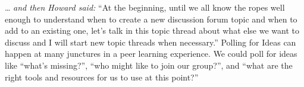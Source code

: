 \ldots{} \emph{and then Howard said:} ``At the beginning, until we all
know the ropes well enough to understand when to create a new discussion
forum topic and when to add to an existing one, let's talk in this topic
thread about what else we want to discuss and I will start new topic
threads when necessary.'' Polling for Ideas can happen at many junctures
in a peer learning experience. We could poll for ideas like ``what's
missing?'', ``who might like to join our group?'', and ``what are the
right tools and resources for us to use at this point?''
